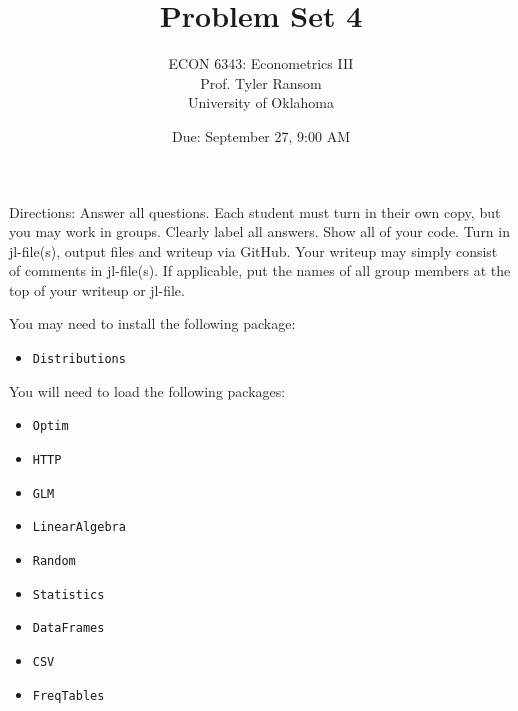 \documentclass[12pt,english]{article}
\begin{document}
\title{Problem Set 4}
\author{ECON 6343: Econometrics III\\
Prof. Tyler Ransom\\
University of Oklahoma}
\date{Due: September 27, 9:00 AM}

\maketitle
Directions: Answer all questions. Each student must turn in their own copy, but you may work in groups. Clearly label all answers. Show all of your code. Turn in jl-file(s), output files and writeup via GitHub. Your writeup may simply consist of comments in jl-file(s). If applicable, put the names of all group members at the top of your writeup or jl-file.

You may need to install the following package:
\begin{itemize}
    \item[~] \texttt{Distributions}
\end{itemize}

You will need to load the following packages:
\begin{itemize}
    \item[~] \texttt{Optim} 
    \item[~] \texttt{HTTP} 
    \item[~] \texttt{GLM} 
    \item[~] \texttt{LinearAlgebra} 
    \item[~] \texttt{Random} 
    \item[~] \texttt{Statistics} 
    \item[~] \texttt{DataFrames} 
    \item[~] \texttt{CSV} 
    \item[~] \texttt{FreqTables}
\end{itemize}
\end{document}
